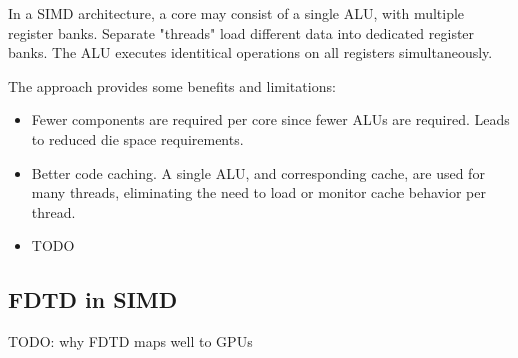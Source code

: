 In a SIMD architecture, a core may consist of a single ALU, with multiple register banks. Separate "threads" load different data into dedicated register banks. The ALU executes identitical operations on all registers simultaneously.

The approach provides some benefits and limitations:

\begin{itemize}
	\item Fewer components are required per core since fewer ALUs are required. Leads to reduced die space requirements.
	\item Better code caching. A single ALU, and corresponding cache, are used for many threads, eliminating the need to load or monitor cache behavior per thread.
	\item TODO
\end{itemize}


\subsection{FDTD in SIMD}

TODO: why FDTD maps well to GPUs



